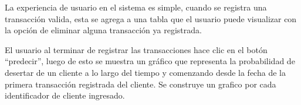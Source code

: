 La experiencia de usuario en el sistema es simple, cuando se registra una transacción valida, esta se agrega a una tabla que el usuario puede visualizar con la opción de eliminar alguna transacción ya registrada.

El usuario al terminar de registrar las transacciones hace clic en el botón “predecir”, luego de esto se muestra un gráfico que representa la probabilidad de desertar de un cliente a lo largo del tiempo y comenzando desde la fecha de la primera transacción registrada del cliente. Se construye un grafico por cada identificador de cliente ingresado.